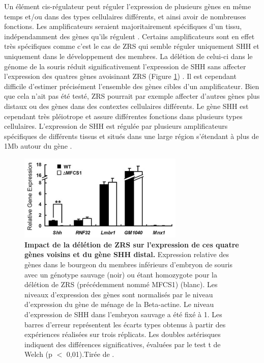 Un élément \gls{cis}-régulateur peut réguler l’expression de plusieurs gènes en même temps et/ou dans des types cellulaires différents, et ainsi avoir de nombreuses fonctions.  Les \glspl{amplificateur} seraient majoritairement spécifiques d’un tissu, indépendamment des gènes qu’ils régulent \citep{singh_enhancer_2021}. Certains \glspl{amplificateur} sont en effet très spécifiques comme c’est le cas de \acrshort{ZRS} qui semble réguler uniquement \acrshort{SHH} et uniquement dans le développement des membres. La délétion de celui-ci dans le génome de la souris réduit significativement l’expression de \acrshort{SHH} sans affecter l'expression des quatres gènes avoisinant \acrshort{ZRS} (Figure \ref{fig:Fig22}) \citep{amano_chromosomal_2009}. Il est cependant difficile d’estimer précisément l’ensemble des gènes cibles d’un \gls{amplificateur}. Bien que cela n'ait pas été testé, \acrshort{ZRS} pourrait par exemple affecter d’autres gènes plus distaux ou des gènes dans des contextes cellulaires différents. Le gène \acrshort{SHH} est cependant très pléiotrope et assure différentes fonctions dans plusieurs types cellulaires. L’expression de \acrshort{SHH} est régulée par plusieurs \glspl{amplificateur} spécifiques de différents tissus et situés dans une large région s’étendant à plus de 1Mb autour du gène \citep{epstein_regionalization_1999, lettice_long-range_2003}. \\

\begin{figure}[H]
    \centering
    \includegraphics[width=0.7\textwidth, page=1] {figures/introduction/fig22.png}
    \caption[Impact de la délétion de \acrshort{ZRS} sur l'expression de ces quatre gènes voisins et du gène \acrshort{SHH} distal.]{
    \textbf{Impact de la délétion de \acrshort{ZRS} sur l'expression de ces quatre gènes voisins et du gène \acrshort{SHH} distal.}
    Expression relative des gènes dans le bourgeon du membres inférieurs d'embryon de souris avec un génotype sauvage (noir) ou étant homozygote pour la délétion de \acrshort{ZRS} (précédemment nommé MFCS1) (blanc). Les niveaux d'expression des gènes sont normalisés par le niveau d'expression du gène de ménage de la Beta-actine. Le niveau d'expression de \acrshort{SHH} dans l'embryon sauvage a été fixé à 1. Les barres d'erreur représentent les écarts types obtenus à partir des expériences réalisées sur trois réplicats. Les doubles astérisques indiquent des différences significatives, évaluées par le test t de Welch (p $<$ 0,01).Tirée de \citep{amano_chromosomal_2009}.\\
    }
    \label{fig:Fig22}
\end{figure}

